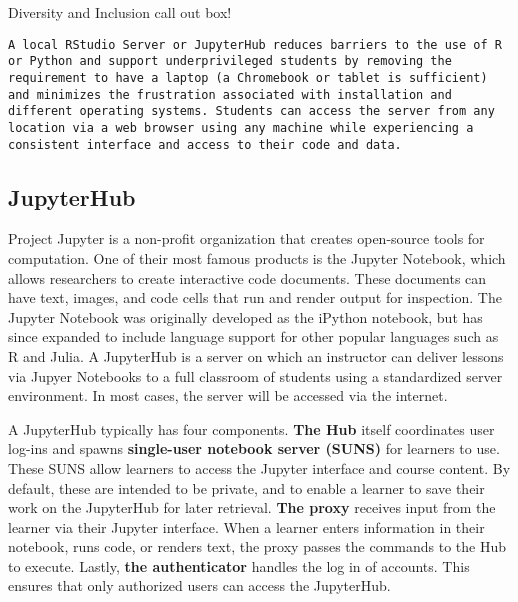 {\begin{framed}
Diversity and Inclusion call out box! 
\begin{snugshade*}
\begin{lstlisting}
A local RStudio Server or JupyterHub reduces barriers to the use of R or Python and support underprivileged students by removing the requirement to have a laptop (a Chromebook or tablet is sufficient) and minimizes the frustration associated with installation and different operating systems. Students can access the server from any location via a web browser using any machine while experiencing a consistent interface and access to their code and data. 
\end{lstlisting}
\end{snugshade*}
\end{framed}}

\subsection{JupyterHub}\label{JupyterHub}

Project Jupyter is a non-profit organization that creates open-source tools for computation.
One of their most famous products is the Jupyter Notebook, which allows researchers to create interactive code documents.
These documents can have text, images, and code cells that run and render output for inspection.
The Jupyter Notebook was originally developed as the iPython notebook, but has since expanded to include language support for other popular languages such as R and Julia.
A JupyterHub is a server on which an instructor can deliver lessons via Jupyer Notebooks to a full classroom of students using a standardized server environment.
In most cases, the server will be accessed via the internet.

A JupyterHub typically has four components. 
\textbf{The Hub} itself coordinates user log-ins and spawns \textbf{single-user notebook server (SUNS)} for learners to use.
These SUNS allow learners to access the Jupyter interface and course content.
By default, these are intended to be private, and to enable a learner to save their work on the JupyterHub for later retrieval. 
\textbf{The proxy} receives input from the learner via their Jupyter interface. 
When a learner enters information in their notebook, runs code, or renders text, the proxy passes the commands to the Hub to execute. 
Lastly, \textbf{the authenticator} handles the log in of accounts.
This ensures that only authorized users can access the JupyterHub. 

